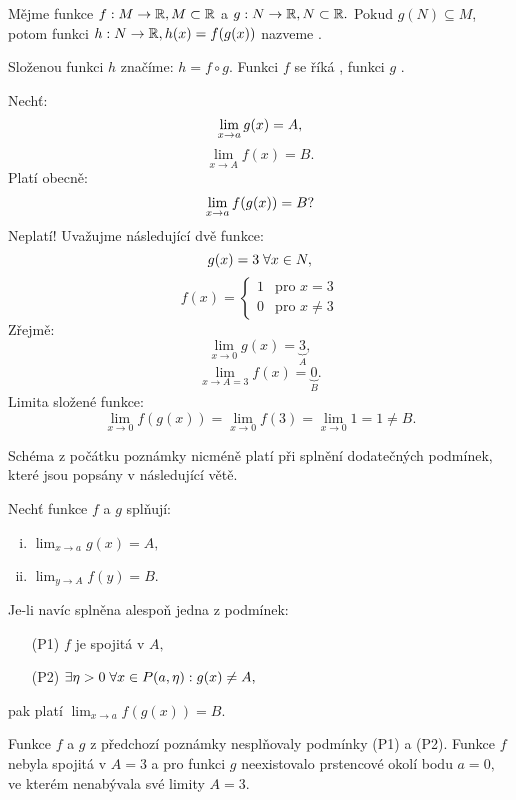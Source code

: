 \begin{definition}
    Mějme funkce $f: M \rightarrow \mathbb{R}, M \subset \mathbb{R}$ a $g: N \rightarrow \mathbb{R}, 
    N \subset \mathbb{R}.$ Pokud $g(N) \subseteq M$, potom funkci $h: N \rightarrow \mathbb{R},
    h(x)=f(g(x))$ nazveme . 
    
    Složenou funkci $h$ značíme: $h = f \circ g.$
    Funkci $f$ se říká , funkci $g$ .
\end{definition}

\begin{remark}
    Nechť:
    $$\lim_{x \to a} g(x) = A,$$
    $$\lim_{x \to A} f(x) = B.$$
    Platí obecně:
    $$\lim_{x \to a} f(g(x)) = B?$$
    Neplatí! Uvažujme následující dvě funkce:
    $$g(x) = 3 \; \forall x \in N,$$
    $$f(x) = \begin{cases}
        1 &\text{pro $x = 3 $} \\
        0 &\text{pro $x \neq 3$}
    \end{cases}$$
    Zřejmě:
    $$\lim_{x \to 0} g(x) = \underbrace{3}_{A},$$
    $$\lim_{x \to A=3} f(x) = \underbrace{0}_{B}.$$
    Limita složené funkce:
    $$\lim_{x \to 0} f(g(x)) = \lim_{x \to 0} f(3) = \lim_{x \to 0} 1 = 1 \neq B.$$

    Schéma z počátku poznámky nicméně platí při splnění dodatečných 
    podmínek, které jsou popsány v následující větě.
\end{remark}

\begin{theorem}
    \label{th:slozenafunkce}
    Nechť funkce $f$ a $g$ splňují:
    \begin{enumerate}[i.]
        \item $\lim_{x \to a} g(x) = A,$
        \item $\lim_{y \to A} f(y) = B.$
    \end{enumerate}
    Je-li navíc splněna alespoň jedna z podmínek:
    \begin{itemize}
        \item[(P1)] $f$ je spojitá v $A,$
        \item[(P2)] $\exists \eta > 0 \; \forall x \in P(a,\eta): g(x) \neq A,$
    \end{itemize}
    pak platí $\lim_{x \to a} f(g(x)) = B.$
\end{theorem}

\begin{remark}
    Funkce $f$ a $g$ z předchozí poznámky nesplňovaly podmínky (P1) a (P2).
    Funkce $f$ nebyla spojitá v $A = 3$ a pro funkci $g$ neexistovalo
    prstencové okolí bodu $a = 0,$ ve kterém nenabývala své limity $A = 3.$
\end{remark}


